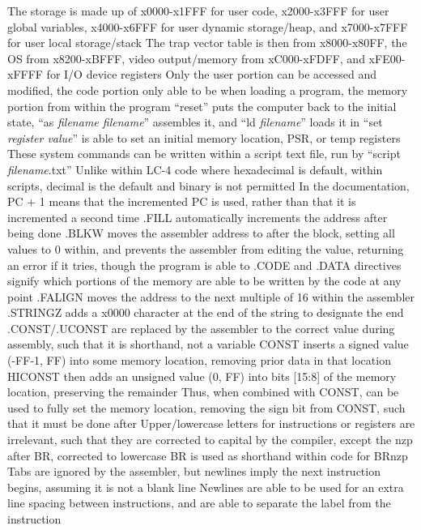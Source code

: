 \documentclass[11 pt, twoside]{article}
\newenvironment{outline*}
{
	\begin{outline}[enumerate]
	}
	{\end{outline}
}
\begin{document}
\begin{outline*}
\1 The storage is made up of x0000-x1FFF for user code, x2000-x3FFF for user global variables, x4000-x6FFF for user dynamic storage/heap, and x7000-x7FFF for user local storage/stack
\2 The trap vector table is then from x8000-x80FF, the OS from x8200-xBFFF, video output/memory from xC000-xFDFF, and xFE00-xFFFF for I/O device registers
\2 Only the user portion can be accessed and modified, the code portion only able to be when loading a program, the memory portion from within the program
\1 ``reset'' puts the computer back to the initial state, ``as \textit{filename filename}'' assembles it, and ``ld \textit{filename}'' loads it in
\2 ``set \textit{register value}'' is able to set an initial memory location, PSR, or temp registers
\2 These system commands can be written within a script text file, run by ``script \textit{filename}.txt''
\3 Unlike within LC-4 code where hexadecimal is default, within scripts, decimal is the default and binary is not permitted
\1 In the documentation, PC + 1 means that the incremented PC is used, rather than that it is incremented a second time
\1 .FILL automatically increments the address after being done
\2 .BLKW moves the assembler address to after the block, setting all values to 0 within, and prevents the assembler from editing the value, returning an error if it tries, though the program is able to
\2 .CODE and .DATA directives signify which portions of the memory are able to be written by the code at any point
\2 .FALIGN moves the address to the next multiple of 16 within the assembler
\2 .STRINGZ adds a x0000 character at the end of the string to designate the end
\2 .CONST/.UCONST are replaced by the assembler to the correct value during assembly, such that it is shorthand, not a variable
\1 CONST inserts a signed value (-FF-1, FF) into some memory location, removing prior data in that location
\2 HICONST then adds an unsigned value (0, FF) into bits [15:8] of the memory location, preserving the remainder
\2 Thus, when combined with CONST, can be used to fully set the memory location, removing the sign bit from CONST, such that it must be done after
\1 Upper/lowercase letters for instructions or registers are irrelevant, such that they are corrected to capital by the compiler, except the nzp after BR, corrected to lowercase
\2 BR is used as shorthand within code for BRnzp
\2 Tabs are ignored by the assembler, but newlines imply the next instruction begins, assuming it is not a blank line
\3 Newlines are able to be used for an extra line spacing between instructions, and are able to separate the label from the instruction
\end{outline*}
\end{document}
